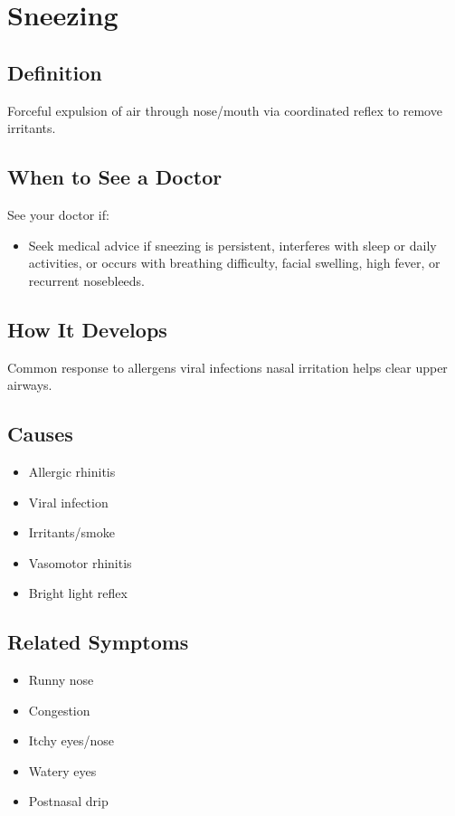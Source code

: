 \chapter{Sneezing}

\section*{Definition}
Forceful expulsion of air through nose/mouth via coordinated reflex to remove irritants.

\section*{When to See a Doctor}
See your doctor if:
\begin{itemize}
  \item Seek medical advice if sneezing is persistent, interferes with sleep or daily activities, or occurs with breathing difficulty, facial swelling, high fever, or recurrent nosebleeds.
\end{itemize}

\section*{How It Develops}
Common response to allergens viral infections nasal irritation helps clear upper airways.

\section*{Causes}
\begin{itemize}
  \item Allergic rhinitis
  \item Viral infection
  \item Irritants/smoke
  \item Vasomotor rhinitis
  \item Bright light reflex
\end{itemize}

\section*{Related Symptoms}
\begin{itemize}
  \item Runny nose
  \item Congestion
  \item Itchy eyes/nose
  \item Watery eyes
  \item Postnasal drip
\end{itemize}

